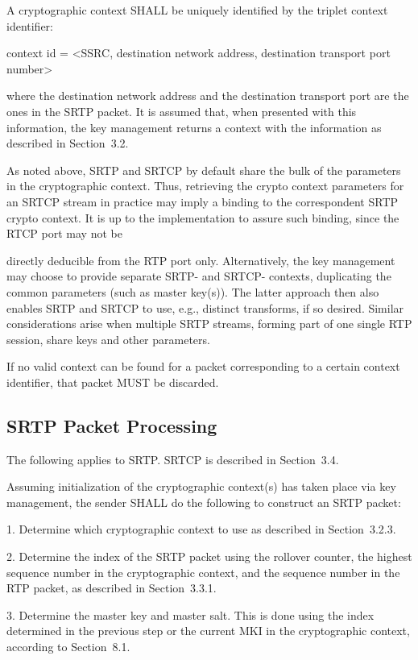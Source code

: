 \documentclass{article}
\begin{document}
A cryptographic context SHALL be uniquely identified by the triplet context identifier:

context id = <SSRC, destination network address, destination transport port number>

where the destination network address and the destination transport port are the ones in the SRTP packet.  It is assumed that, when presented with this information, the key management returns a context with the information as described in Section~3.2.

As noted above, SRTP and SRTCP by default share the bulk of the parameters in the cryptographic context.  Thus, retrieving the crypto context parameters for an SRTCP stream in practice may imply a binding to the correspondent SRTP crypto context.  It is up to the implementation to assure such binding, since the RTCP port may not be

directly deducible from the RTP port only.  Alternatively, the key management may choose to provide separate SRTP- and SRTCP- contexts, duplicating the common parameters (such as master key(s)).  The latter approach then also enables SRTP and SRTCP to use, e.g., distinct transforms, if so desired.  Similar considerations arise when multiple SRTP streams, forming part of one single RTP session, share keys and other parameters.

If no valid context can be found for a packet corresponding to a certain context identifier, that packet MUST be discarded.

\subsection{SRTP Packet Processing}

The following applies to SRTP.  SRTCP is described in Section~3.4.

Assuming initialization of the cryptographic context(s) has taken place via key management, the sender SHALL do the following to construct an SRTP packet:

1. Determine which cryptographic context to use as described in Section~3.2.3.

2. Determine the index of the SRTP packet using the rollover counter, the highest sequence number in the cryptographic context, and the sequence number in the RTP packet, as described in Section~3.3.1.

3. Determine the master key and master salt.  This is done using the index determined in the previous step or the current MKI in the cryptographic context, according to Section~8.1.
\end{document}
